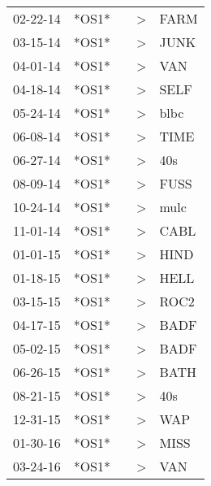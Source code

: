 \begin{supertabular}{p{0.07\textwidth}p{0.06\textwidth}p{0.02\textwidth}p{0.02\textwidth}p{0.06\textwidth}}
 02-22-14\textsuperscript{} &  *OS1* &   &  \textgreater &  FARM\textsuperscript{} \\
 03-15-14\textsuperscript{} &  *OS1* &   &  \textgreater &  JUNK\textsuperscript{} \\
 04-01-14\textsuperscript{} &  *OS1* &   &  \textgreater &   VAN\textsuperscript{} \\
 04-18-14\textsuperscript{} &  *OS1* &   &  \textgreater &  SELF\textsuperscript{} \\
 05-24-14\textsuperscript{} &  *OS1* &   &  \textgreater &  blbc\textsuperscript{} \\
 06-08-14\textsuperscript{} &  *OS1* &   &  \textgreater &  TIME\textsuperscript{} \\
 06-27-14\textsuperscript{} &  *OS1* &   &  \textgreater &   40s\textsuperscript{} \\
 08-09-14\textsuperscript{} &  *OS1* &   &  \textgreater &  FUSS\textsuperscript{} \\
 10-24-14\textsuperscript{} &  *OS1* &   &  \textgreater &  mulc\textsuperscript{} \\
 11-01-14\textsuperscript{} &  *OS1* &   &  \textgreater &  CABL\textsuperscript{} \\
 01-01-15\textsuperscript{} &  *OS1* &   &  \textgreater &  HIND\textsuperscript{} \\
 01-18-15\textsuperscript{} &  *OS1* &   &  \textgreater &  HELL\textsuperscript{} \\
 03-15-15\textsuperscript{} &  *OS1* &   &  \textgreater &  ROC2\textsuperscript{} \\
 04-17-15\textsuperscript{} &  *OS1* &   &  \textgreater &  BADF\textsuperscript{} \\
 05-02-15\textsuperscript{} &  *OS1* &   &  \textgreater &  BADF\textsuperscript{} \\
 06-26-15\textsuperscript{} &  *OS1* &   &  \textgreater &  BATH\textsuperscript{} \\
 08-21-15\textsuperscript{} &  *OS1* &   &  \textgreater &   40s\textsuperscript{} \\
 12-31-15\textsuperscript{} &  *OS1* &   &  \textgreater &   WAP\textsuperscript{} \\
 01-30-16\textsuperscript{} &  *OS1* &   &  \textgreater &  MISS\textsuperscript{} \\
 03-24-16\textsuperscript{} &  *OS1* &   &  \textgreater &   VAN\textsuperscript{} \\

\end{supertabular}
